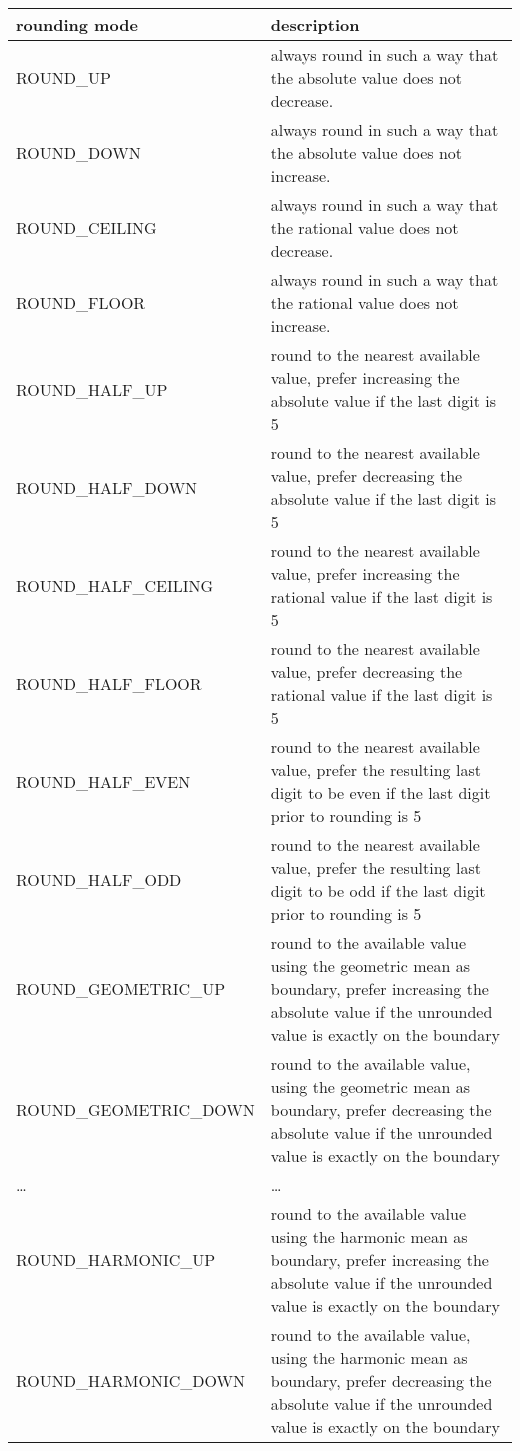 \documentclass[10pt,a4paper]{article}
\begin{document}
\begin{tabular}{|l|p{100mm}|}
\hline
{\bfseries rounding mode}&{\bfseries description}\\
\hline
  ROUND\_UP           & always round in such a way that the absolute value does not decrease.\\
\hline
  ROUND\_DOWN         & always round in such a way that the absolute value does not increase.\\
\hline
  ROUND\_CEILING      & always round in such a way that the rational value does not decrease.\\
\hline
  ROUND\_FLOOR        & always round in such a way that the rational value does not increase.\\
\hline
  ROUND\_HALF\_UP      & round to the nearest available value, prefer increasing the absolute value if the last digit is 5\\
\hline
  ROUND\_HALF\_DOWN    & round to the nearest available value, prefer decreasing the absolute value if the last digit is 5\\
\hline
  ROUND\_HALF\_CEILING & round to the nearest available value, prefer increasing the rational value if the last digit is 5\\
\hline
  ROUND\_HALF\_FLOOR   & round to the nearest available value, prefer decreasing the rational value if the last digit is 5\\
\hline
  ROUND\_HALF\_EVEN    & round to the nearest available value, prefer the resulting last digit to be even if the last digit prior to rounding is 5\\
\hline
  ROUND\_HALF\_ODD    & round to the nearest available value, prefer the resulting last digit to be odd if the last digit prior to rounding is 5\\
\hline
  ROUND\_GEOMETRIC\_UP      & round to the available value using the geometric mean as boundary, prefer increasing the absolute value if the unrounded value is exactly on the boundary\\
\hline
  ROUND\_GEOMETRIC\_DOWN    & round to the available value, using the geometric mean as boundary, prefer decreasing the absolute value if the unrounded value is exactly on the boundary\\
\hline
  \dots & \ldots\\
\hline
  ROUND\_HARMONIC\_UP      & round to the available value using the harmonic mean as boundary, prefer increasing the absolute value if the unrounded value is exactly on the boundary\\
\hline
  ROUND\_HARMONIC\_DOWN    & round to the available value, using the harmonic mean as boundary, prefer decreasing the absolute value if the unrounded value is exactly on the boundary\\

\end{tabular}
\end{document}

